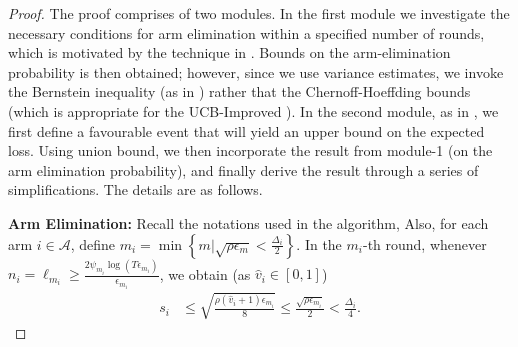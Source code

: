 \begin{proof}
The proof comprises of two modules. In the first module we investigate the necessary conditions for arm elimination within a specified number of rounds, which is motivated by the technique in \cite{auer2010ucb}. Bounds on the arm-elimination probability is then obtained; however, since we use variance estimates, we invoke the Bernstein inequality (as in \cite{audibert2009exploration}) rather that the Chernoff-Hoeffding bounds (which is appropriate for the UCB-Improved \cite{auer2010ucb}). In the second module, as in \cite{locatelli2016optimal}, we first define a favourable event that will yield an upper bound on the expected loss. Using union bound, we then incorporate the result from module-1 (on the arm elimination probability), and finally derive the result through a series of simplifications.
The details are as follows. 


\textbf{Arm Elimination:} Recall the notations used in the algorithm, Also, for each arm $i\in\mathcal{A}$, define $m_{i}=\min\left\lbrace m| \sqrt{\rho\epsilon_{m}}<\frac{\Delta_{i}}{2}\right\rbrace$. In the $m_i$-th round, whenever $n_i=\ell_{m_i}\ge\frac{2\psi_{m_i}\log{(T\epsilon_{m_{i}})}}{\epsilon_{m_{i}}}$, we obtain (as $\hat{v}_i\in[0,1]$)
%
%
\begin{align}
\label{si_bound_equn}
s_i 
&\le \sqrt{\frac{\rho(\hat{v}_i+1)\epsilon_{m_i}}{8}}
  \le \frac{\sqrt{\rho\epsilon_{m_i}}}{2} < \frac{\Delta_i}{4}.
\end{align}


\end{proof}
